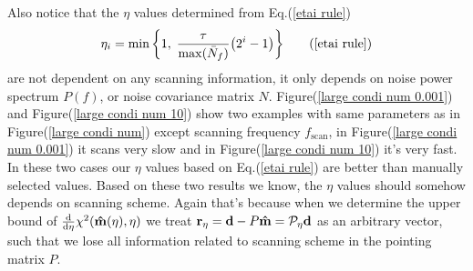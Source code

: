 \documentclass[11pt, letterpaper]{article}
\newcommand{\vbd}{\vb{d}}
\newcommand{\hatm}{\vb{\hat{m}}}
\newcommand{\Nbar}{\bar{N}}
\begin{document}
Also notice that the $\eta$ values determined from Eq.(\ref{etai rule})
\begin{align}
\eta_i =\min \qty\bigg{1,\; \frac{\tau}{\max(\Nbar_f)} \qty(2^i -1) } 
\tag{\ref{etai rule}}
\end{align}
are not dependent on any scanning information,
it only depends on noise power spectrum $P(f)$, or noise covariance matrix $N$.
Figure(\ref{large condi num 0.001}) and Figure(\ref{large condi num 10}) show
two examples with same parameters as in Figure(\ref{large condi num}) except 
scanning frequency $f_{\text{scan}}$, in Figure(\ref{large condi num 0.001}) it
scans very slow and in Figure(\ref{large condi num 10}) it's very fast.
In these two cases our $\eta$ values based on Eq.(\ref{etai rule}) are better
than manually selected values.
Based on these two results we know, the $\eta$ values should somehow depends
on scanning scheme.
Again that's because when we determine the upper bound of 
$\dv{\eta} \chi^2(\hatm(\eta), \eta)$ we treat
$\vb{r}_{\eta} = \vbd - P\hatm = \mathcal{P}_{\eta} \vbd$
as an arbitrary vector, such that we lose all information related to scanning 
scheme in the pointing matrix $P$.
\end{document}
